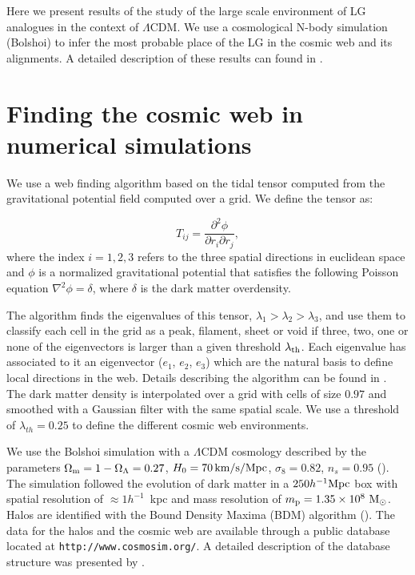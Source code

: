 \documentclass{iau}
\newcommand{\hMpc}{{\ifmmode{h^{-1}{\rm Mpc}}\else{$h^{-1}$Mpc }\fi}}
\newcommand{\hmpc}{{\ifmmode{h^{-1}{\rm Mpc}}\else{$h^{-1}$Mpc }\fi}}
\begin{document}
Here we present results of the study of the large scale environment of
LG analogues in the context of $\Lambda$CDM. We use a cosmological
N-body simulation (Bolshoi) to infer the most probable place of the LG
in the cosmic web and its alignments. A detailed description
of these results can found in \cite{lgweb}.



\section{Finding the cosmic web in numerical simulations}

We use a web finding algorithm based on the tidal tensor computed from
the gravitational potential field computed over a grid. We define the
tensor as:

\begin{equation}
T_{ij} = \frac{\partial^2\phi}{\partial r_{i}\partial r_{j}}, 
\end{equation}
%
where the index $i=1,2,3$ refers to the three spatial directions in
euclidean space and $\phi$ is a normalized gravitational potential
that satisfies the following Poisson equation $\nabla^2 \phi=\delta$,
where $\delta$ is the dark matter overdensity.

The algorithm finds the eigenvalues of this tensor, 
$\lambda_1>\lambda_2>\lambda_3$, and use them to classify each cell in
the grid as a peak, filament, sheet or void if three, two, one or none
of the eigenvectors is larger than a given threshold $\lambda_{\rm
  th}$. Each eigenvalue has associated to it an eigenvector ($e_{1}$,
$e_{2}$, $e_{3}$) which are the natural basis to define local
directions in the web. Details describing the algorithm can be found
in \cite[Forero-Romero et al. (2009)]{Tweb}. The dark matter density
is interpolated over a grid with cells of size $0.97$ \hMpc and
smoothed with a Gaussian filter with the same spatial scale. We use a
threshold of $\lambda_{th}=0.25$ to define the different cosmic web
environments. 


We use the Bolshoi simulation with a $\Lambda$CDM cosmology described
by the parameters $\Omega_{\rm m}=1-\Omega_{\Lambda}=0.27$,
$H_0=70\,\rm km/s/Mpc$, $\sigma_8=0.82$, $n_s=0.95$
(\cite{2011ApJ...740..102K}). The simulation followed the evolution of dark
matter in a $250 \hmpc$ box with spatial resolution of $\approx
1h^{-1}$~kpc and mass resolution of $m_{\rm p}=1.35\times 10^8\ \rm
M_{\odot}$. Halos are identified with the Bound Density Maxima (BDM) algorithm
(\cite{1997astro.ph.12217K}). The data for the halos and the cosmic
web are available through a public database located at
{\tt http://www.cosmosim.org/}. A detailed description of the database
structure was presented by \cite{Riebe2013}. 
\end{document}
